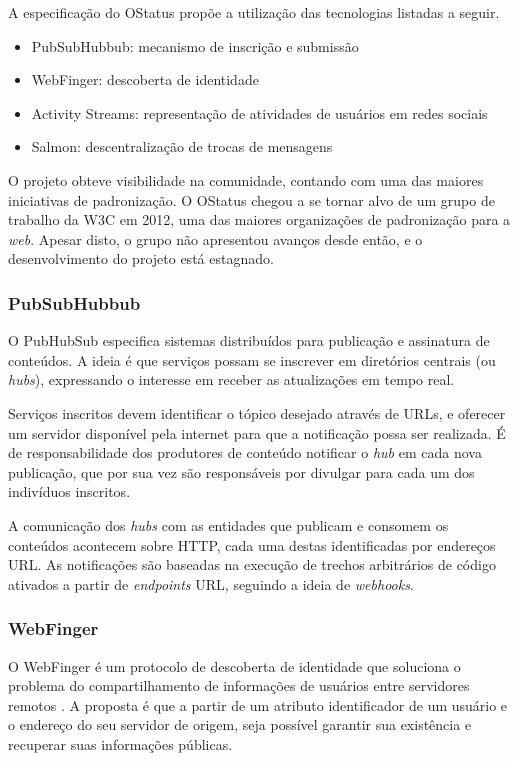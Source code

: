 A especificação do OStatus propõe a utilização das tecnologias listadas a seguir.

\begin{itemize}
  \item{PubSubHubbub: mecanismo de inscrição e submissão}
  \item{WebFinger: descoberta de identidade}
  \item{Activity Streams: representação de atividades de usuários em redes sociais}
  \item{Salmon: descentralização de trocas de mensagens}
\end{itemize}

O projeto obteve visibilidade na comunidade, contando com uma das maiores
iniciativas de padronização. O OStatus chegou a se tornar alvo de um grupo de
trabalho da W3C em 2012, uma das maiores organizações de padronização para a
\textit{web}. Apesar disto, o grupo não apresentou avanços desde então, e o
desenvolvimento do projeto está estagnado.

\subsubsection{PubSubHubbub}

O PubHubSub especifica sistemas distribuídos para publicação e assinatura de
conteúdos. A ideia é que serviços possam se inscrever em diretórios centrais (ou
\textit{hubs}), expressando o interesse em receber as atualizações em tempo real.

Serviços inscritos devem identificar o tópico desejado através de URLs, e oferecer
um servidor disponível pela internet para que a notificação possa ser realizada.
É de responsabilidade dos produtores de conteúdo notificar o \textit{hub} em cada
nova publicação, que por sua vez são responsáveis por divulgar para cada um dos
indivíduos inscritos.

A comunicação dos \textit{hubs} com as entidades que publicam e consomem os
conteúdos acontecem sobre HTTP, cada uma destas identificadas por endereços URL. As
notificações são baseadas na execução de trechos arbitrários de código ativados a
partir de \textit{endpoints} URL, seguindo a ideia de \textit{webhooks}.

\subsubsection{WebFinger}

O WebFinger é um protocolo de descoberta de identidade que soluciona o problema do
compartilhamento de informações de usuários entre servidores remotos \cite{rfc7033}.
A proposta é que a partir de um atributo identificador de um usuário e o endereço do
seu servidor de origem, seja possível garantir sua existência e recuperar suas
informações públicas.

